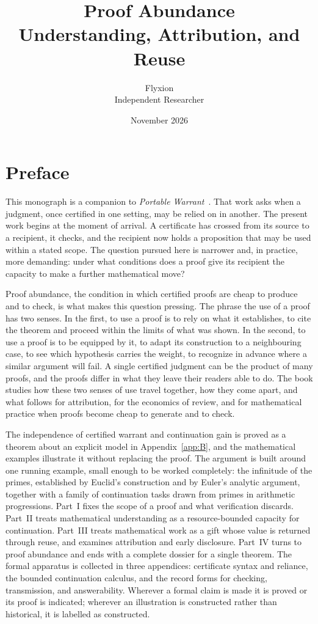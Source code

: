 \documentclass[11pt]{book}
\title{\textbf{Proof Abundance}\\[0.6em]
\large Understanding, Attribution, and Reuse}
\author{Flyxion\\ Independent Researcher}
\date{November 2026}
\theoremstyle{definition}
\theoremstyle{remark}
\begin{document}
\frontmatter
\maketitle

\chapter*{Preface}

This monograph is a companion to \emph{Portable Warrant}~\cite{flyxion-portable}. That work asks when a judgment, once certified in one setting, may be relied on in another. The present work begins at the moment of arrival. A certificate has crossed from its source to a recipient, it checks, and the recipient now holds a proposition that may be used within a stated scope. The question pursued here is narrower and, in practice, more demanding: under what conditions does a proof give its recipient the capacity to make a further mathematical move?

Proof abundance, the condition in which certified proofs are cheap to produce and to check, is what makes this question pressing. The phrase the use of a proof has two senses. In the first, to use a proof is to rely on what it establishes, to cite the theorem and proceed within the limits of what was shown. In the second, to use a proof is to be equipped by it, to adapt its construction to a neighbouring case, to see which hypothesis carries the weight, to recognize in advance where a similar argument will fail. A single certified judgment can be the product of many proofs, and the proofs differ in what they leave their readers able to do. The book studies how these two senses of use travel together, how they come apart, and what follows for attribution, for the economics of review, and for mathematical practice when proofs become cheap to generate and to check.

The independence of certified warrant and continuation gain is proved as a theorem about an explicit model in Appendix~\ref{app:B}, and the mathematical examples illustrate it without replacing the proof. The argument is built around one running example, small enough to be worked completely: the infinitude of the primes, established by Euclid's construction and by Euler's analytic argument, together with a family of continuation tasks drawn from primes in arithmetic progressions. Part~I fixes the scope of a proof and what verification discards. Part~II treats mathematical understanding as a resource-bounded capacity for continuation. Part~III treats mathematical work as a gift whose value is returned through reuse, and examines attribution and early disclosure. Part~IV turns to proof abundance and ends with a complete dossier for a single theorem. The formal apparatus is collected in three appendices: certificate syntax and reliance, the bounded continuation calculus, and the record forms for checking, transmission, and answerability. Wherever a formal claim is made it is proved or its proof is indicated; wherever an illustration is constructed rather than historical, it is labelled as constructed.
\end{document}
